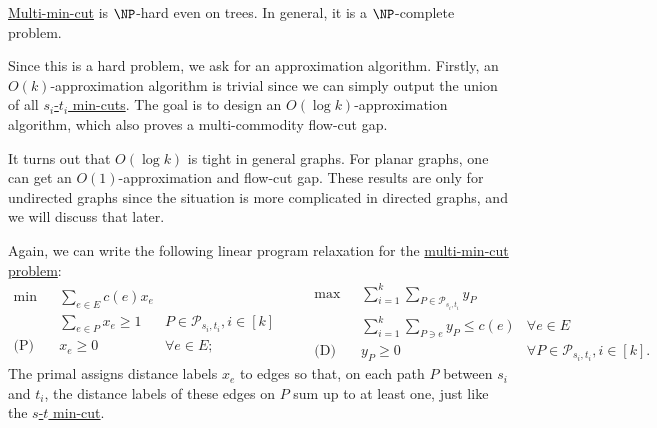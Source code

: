 \begin{remark}
	\hyperref[prb:multi-min-cut]{Multi-min-cut} is \(\NP\)-hard even on trees. In general, it is a \(\NP\)-complete problem.
\end{remark}

Since this is a hard problem, we ask for an approximation algorithm. Firstly, an \(O(k)\)-approximation algorithm is trivial since we can simply output the union of all \hyperref[prb:s-t-min-cut]{\(s_i\)-\(t_i\) min-cuts}. The goal is to design an \(O(\log k)\)-approximation algorithm, which also proves a multi-commodity flow-cut gap.

\begin{note}
	It turns out that \(O(\log k)\) is tight in general graphs. For planar graphs, one can get an \(O(1)\)-approximation and flow-cut gap. These results are only for undirected graphs since the situation is more complicated in directed graphs, and we will discuss that later.
\end{note}

Again, we can write the following linear program relaxation for the \hyperref[prb:multi-min-cut]{multi-min-cut problem}:
\begin{equation}\label{eq:multi-min-cut-LP}
	\begin{aligned}
		\min~           & \sum_{e \in E} c(e) x_e                                             \\
		                & \sum_{e \in P} x_e \geq 1 & P \in \mathcal{P}_{s_i, t_i}, i \in [k] \\
		\text{(P)}\quad & x_e \geq 0                & \forall e \in E;
	\end{aligned}\qquad
	\begin{aligned}
		\max~           & \sum_{i=1}^{k} \sum_{P \in \mathcal{P}_{s_i, t_i}} y_P                                                    \\
		                & \sum_{i=1}^{k} \sum_{P \ni e} y_P \leq c(e)            & \forall e \in E                                  \\
		\text{(D)}\quad & y_P \geq 0                                             & \forall P \in \mathcal{P}_{s_i, t_i}, i \in [k].
	\end{aligned}
\end{equation}
The primal assigns distance labels \(x_e\) to edges so that, on each path \(P\) between \(s_i\) and \(t_i\), the distance labels of these edges on \(P\) sum up to at least one, just like the \hyperref[prb:s-t-min-cut]{\(s\)-\(t\) min-cut}.

